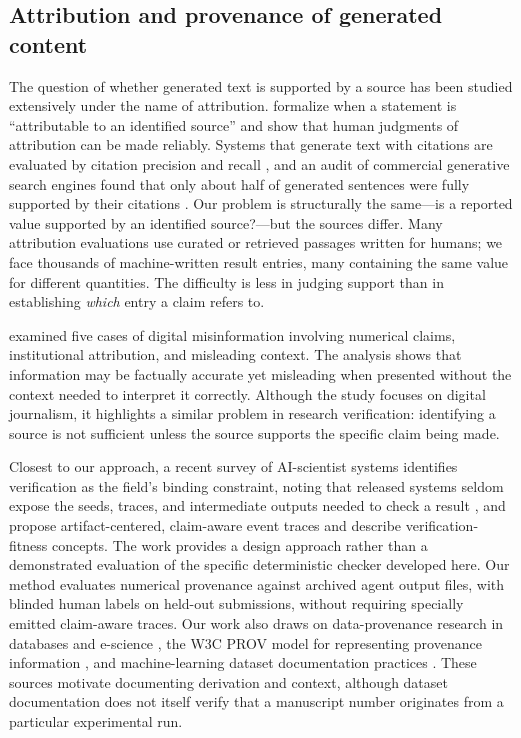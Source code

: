 \documentclass[preprint,12pt,authoryear]{elsarticle}
\begin{document}
\subsection{Attribution and provenance of generated content}\label{sec:rw-attribution}

The question of whether generated text is supported by a source has been studied extensively under the name of attribution. \citet{rashkin2023ais} formalize when a statement is ``attributable to an identified source'' and show that human judgments of attribution can be made reliably. Systems that generate text with citations are evaluated by citation precision and recall \citep{gao2023alce}, and an audit of commercial generative search engines found that only about half of generated sentences were fully supported by their citations \citep{liu2023verifiability}. Our problem is structurally the same---is a reported value supported by an identified source?---but the sources differ. Many attribution evaluations use curated or retrieved passages written for humans; we face thousands of machine-written result entries, many containing the same value for different quantities. The difficulty is less in judging support than in establishing \emph{which} entry a claim refers to.

\citet{yaseen2026verification} examined five cases of digital misinformation involving numerical claims, institutional attribution, and misleading context. The analysis shows that information may be factually accurate yet misleading when presented without the context needed to interpret it correctly. Although the study focuses on digital journalism, it highlights a similar problem in research verification: identifying a source is not sufficient unless the source supports the specific claim being made.

Closest to our approach, a recent survey of AI-scientist systems identifies verification as the field's binding constraint, noting that released systems seldom expose the seeds, traces, and intermediate outputs needed to check a result \citep{ding2026survey}, and \citet{yin2026observability} propose artifact-centered, claim-aware event traces and describe verification-fitness concepts. The work provides a design approach rather than a demonstrated evaluation of the specific deterministic checker developed here. Our method evaluates numerical provenance against archived agent output files, with blinded human labels on held-out submissions, without requiring specially emitted claim-aware traces. Our work also draws on data-provenance research in databases and e-science \citep{simmhan2005provenance,herschel2017provenance}, the W3C PROV model for representing provenance information \citep{moreau2013prov}, and machine-learning dataset documentation practices \citep{gebru2021datasheets}. These sources motivate documenting derivation and context, although dataset documentation does not itself verify that a manuscript number originates from a particular experimental run.
\end{document}
